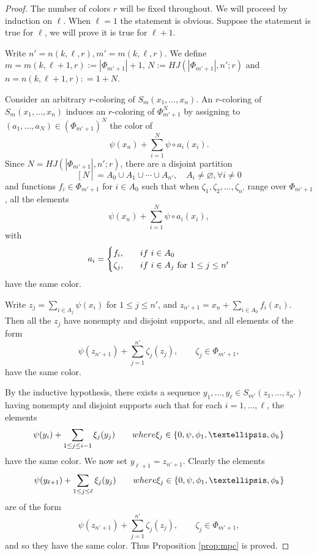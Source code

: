 \documentclass[10pt]{article}
\theoremstyle{definition}
\begin{document}
\begin{proof}
The number of colors $r$ will be fixed throughout. We will proceed by induction on $\ell$. When $\ell=1$ the statement is obvious. Suppose the statement is true for $\ell$, we will prove it is true for $\ell+1$. 

Write $n' = n(k,\ell, r), m'=m(k,\ell, r)$. We define $m = m(k,\ell + 1, r):=|\Phi_{m'+1}| +1$, $N:=HJ( |\Phi_{m'+1}|, n';r)$ and $n = n(k, \ell+1,r): = 1 + N$.

Consider an arbitrary $r$-coloring of $S_{m}(x_1,\ldots, x_n)$. An $r$-coloring of $S_{m}(x_1,\ldots, x_n)$ induces an $r$-coloring of $\Phi_{m'+1}^{N}$ by assigning to 
$(a_1, \ldots, a_{N}) \in (\Phi_{m'+1})^{N}$ the color of 
\[
\psi (x_n) + \sum_{i=1}^{N} \psi \circ a_i (x_i).
\]
Since $N=HJ( |\Phi_{m'+1}|, n';r)$, there are a disjoint partition
\[
[N] = A_0 \cup A_1 \cup \cdots \cup A_{n'}, \quad A_i \neq \varnothing, \forall i \neq 0
\]
and functions $f_i \in \Phi_{m' + 1}$ for $i \in A_0$ such that when $\zeta_1, \zeta_2, \ldots, \zeta_{n'}$ range over $\Phi_{m'+1}$, all the elements 
\[
\psi(x_n) + \sum_{i=1}^{N} \psi \circ a_i (x_i),
\] 
with
\begin{equation*}
a_i = 
\begin{cases}
f_i, \quad &\textup{if}\ i \in A_0 \\
\zeta_j, \quad &\textup{if}\ i \in A_j \text{ for } 1 \leq j \leq n'
\end{cases}
\end{equation*}
have the same color.

Write $z_j = \sum_{i \in A_j} \psi(x_i)$ for $1 \leq j \leq n'$, and $z_{n'+1} = x_{n} + \sum_{i \in A_0} f_i(x_i)$. Then all the $z_j$ have nonempty and disjoint supports, and all elements of the form
\[
\psi(z_{n'+1}) + \sum_{j=1}^{n'} \zeta_j (z_j), \qquad \zeta_j \in \Phi_{m'+1},
\]
have the same color.

By the inductive hypothesis, there exists a sequence $y_1, \ldots, y_\ell \in S_{m'} (z_1, \ldots, z_{n'})$ having nonempty and disjoint supports such that for each $i=1, \ldots, \ell$, the elements
\[
\psi(y_i) + \sum_{1 \leq j \leq i-1} \xi_j (y_j) \qquad \textup{ where } \xi_j \in \{ 0, \psi, \phi_1, \ldots, \phi_k \}
\]
have the same color. We now set $y_{\ell+1} = z_{n'+1}$. Clearly the elements 
\[
\psi(y_{\ell+1}) + \sum_{1 \leq j \leq \ell} \xi_j (y_j) \qquad \textup{ where } \xi_j \in \{ 0, \psi, \phi_1, \ldots, \phi_k \}
\]
are of the form
\[
\psi(z_{n'+1}) + \sum_{j=1}^{n'} \zeta_j (z_j), \qquad \zeta_j \in \Phi_{m'+1},
\]
and so they have the same color. Thus  Proposition \ref{prop:mpc} is proved.
\end{proof}
\end{document}
